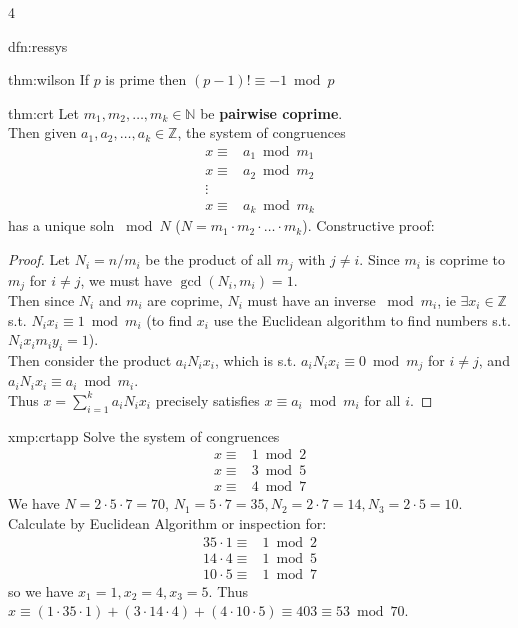 \documentclass[landscape, 8pt]{extarticle}
\begin{document}
\begin{multicols*}{4}
\begin{dfn}{dfn:ressys}{ }
		\end{dfn}
		
		
		\begin{thm}{thm:wilson}{ }
			If $p$ is prime then $(p-1)! \equiv -1 \bmod{p}$
			
		\end{thm}
		
		
		\begin{mthm}{thm:crt}{ }
			Let $m_1, m_2, \dots, m_k\in \mathbb{N}$ be \textbf{pairwise coprime}. \\
			Then given $a_1, a_2, \dots, a_k\in \mathbb{Z}$, the system of congruences
			\begin{align*}
				x \equiv& a_1 \bmod{m_1}\\
				x \equiv& a_2 \bmod{m_2}\\
				\vdots& \\
				x \equiv& a_k \bmod{m_k}
			\end{align*}
			has a unique soln $\bmod{N}$ ($N = m_1 \cdot m_2 \cdot \dots \cdot m_k$). Constructive proof:
			\vspace*{-3ex}
			\begin{proof}
				Let $N_i = n/m_i$ be the product of all $m_j$ with $j\ne i$. Since $m_i$ is coprime to $m_j$ for $i\ne j$, we must have $\gcd(N_i, m_i) = 1$. \\
				Then since $N_i$ and $m_i$ are coprime, $N_i$ must have an inverse $\bmod{m_i}$, ie $\exists x_i\in \mathbb{Z}$ s.t. $N_i x_i \equiv 1 \bmod{m_i}$ (to find $x_i$ use the Euclidean algorithm to find numbers s.t. $N_i x_i  m_i y_i = 1$).\\
				Then consider the product $a_i N_i x_i$, which is s.t. $a_i N_i x_i \equiv 0 \bmod{m_j}$ for $i \ne j$, and $a_i N_i x_i \equiv a_i \bmod{m_i}$.\\
				Thus $x = \sum_{i=1}^{k}a_i N_i x_i$ precisely satisfies $x \equiv a_i \bmod{m_i}$ for all $i$.
			\end{proof}
			
		\end{mthm}
		
		
		\begin{xmp}{xmp:crtapp}{ }
			Solve the system of congruences
			\begin{align*}
				x \equiv& 1 \bmod{2}\\
				x \equiv& 3 \bmod{5}\\
				x \equiv& 4 \bmod{7}
			\end{align*}
		We have $N = 2 \cdot 5 \cdot 7 = 70$, $N_1 = 5 \cdot 7 = 35, N_2 = 2 \cdot 7 = 14, N_3 = 2 \cdot 5 = 10$. Calculate by Euclidean Algorithm or inspection for:
		\begin{align*}
			35 \cdot 1 \equiv& 1 \bmod{2}\\
			14 \cdot 4 \equiv& 1 \bmod{5}\\
			10 \cdot 5 \equiv& 1 \bmod{7}
		\end{align*}
		so we have $x_1 = 1, x_2 = 4, x_3 = 5$. Thus $x \equiv (1 \cdot 35 \cdot 1) + (3 \cdot 14 \cdot 4) + (4\cdot 10 \cdot 5) \equiv 403 \equiv 53 \bmod{70}$. 
			

\end{xmp}
\end{multicols*}
\end{document}
